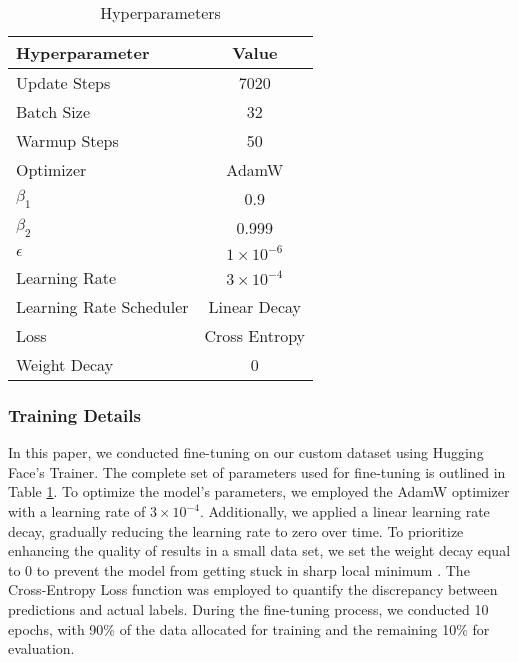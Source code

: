 \documentclass[conference]{IEEEtran}
\begin{document}
\begin{table}[!h]
    \begin{center}
        \caption{Hyperparameters} 
        \begin{tabular}{|l|c|} 
             \hline
              Hyperparameter & Value  \\ [1ex] 
            \hline

             Update Steps & 7020  \\ [1ex] 

             Batch Size & 32 \\ [1ex] 

             Warmup Steps & 50  \\ [1ex] 

             Optimizer & AdamW  \\ [1ex] 

             $\beta_1$ & 0.9  \\ [1ex]

             $\beta_2$ & 0.999  \\ [1ex]

             $\epsilon$ & $1\times 10^{-6}$  \\ [1ex]

             Learning Rate & $3\times 10^{-4}$ \\ [1ex]

             Learning Rate Scheduler & Linear Decay \\ [1ex]

             Loss & Cross Entropy \\ [1ex]

             Weight Decay & 0  \\ [1ex]

             \hline


        \end{tabular}
    \end{center}
    \label{table:hyperparameters}
    
\end{table}
        

\subsubsection{Training Details}\label{SCM}
In this paper, we conducted fine-tuning on our custom dataset using Hugging Face's Trainer. The complete set of parameters used for fine-tuning is outlined in Table \ref{table:hyperparameters}. To optimize the model's parameters, we employed the AdamW optimizer \cite{Adam} with a learning rate of $3\times 10^{-4}$. Additionally, we applied a linear learning rate decay, gradually reducing the learning rate to zero over time. To prioritize enhancing the quality of results in a small data set, we set the weight decay equal to 0 to prevent the model from getting stuck in sharp local minimum \cite{sharp-minimum-introduction} \cite{sharp-mimimum-smoothing}. The Cross-Entropy Loss function \cite{cross-entropy} was employed to quantify the discrepancy between predictions and actual labels. During the fine-tuning process, we conducted 10 epochs, with 90\% of the data allocated for training and the remaining 10\% for evaluation.
\end{document}
